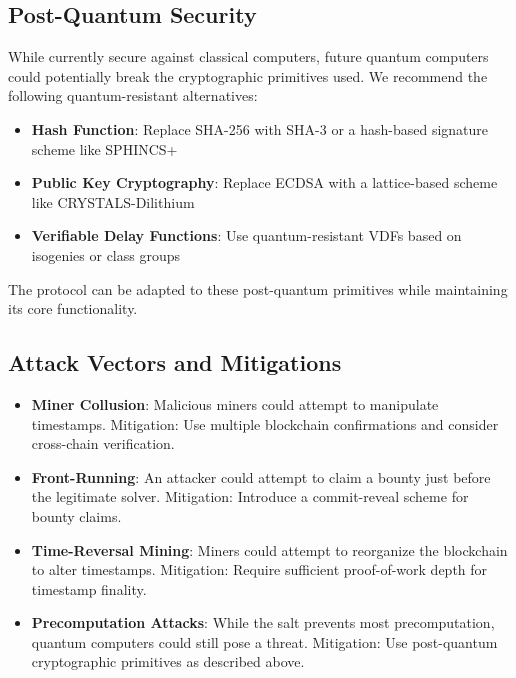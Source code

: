 \documentclass[12pt]{report}
\begin{document}
\subsection{Post-Quantum Security}
While currently secure against classical computers, future quantum computers could potentially break the cryptographic primitives used. We recommend the following quantum-resistant alternatives:

\begin{itemize}
    \item \textbf{Hash Function}: Replace SHA-256 with SHA-3 or a hash-based signature scheme like SPHINCS+
    \item \textbf{Public Key Cryptography}: Replace ECDSA with a lattice-based scheme like CRYSTALS-Dilithium
    \item \textbf{Verifiable Delay Functions}: Use quantum-resistant VDFs based on isogenies or class groups
\end{itemize}

The protocol can be adapted to these post-quantum primitives while maintaining its core functionality.

\subsection{Attack Vectors and Mitigations}
\begin{itemize}
    \item \textbf{Miner Collusion}: Malicious miners could attempt to manipulate timestamps. Mitigation: Use multiple blockchain confirmations and consider cross-chain verification.
    \item \textbf{Front-Running}: An attacker could attempt to claim a bounty just before the legitimate solver. Mitigation: Introduce a commit-reveal scheme for bounty claims.
    \item \textbf{Time-Reversal Mining}: Miners could attempt to reorganize the blockchain to alter timestamps. Mitigation: Require sufficient proof-of-work depth for timestamp finality.
    \item \textbf{Precomputation Attacks}: While the salt prevents most precomputation, quantum computers could still pose a threat. Mitigation: Use post-quantum cryptographic primitives as described above.
\end{itemize}
\end{document}
